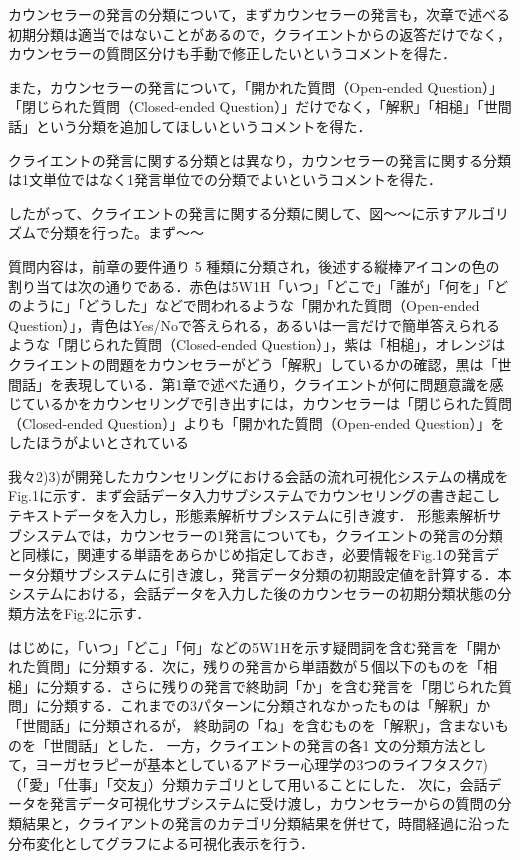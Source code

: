 \documentclass[shuuron]{kuee}
\begin{document}
カウンセラーの発言の分類について，まずカウンセラーの発言も，次章で述べる初期分類は適当ではないことがあるので，クライエントからの返答だけでなく，カウンセラーの質問区分けも手動で修正したいというコメントを得た．

また，カウンセラーの発言について，「開かれた質問（Open-ended Question）」「閉じられた質問（Closed-ended Question）」だけでなく，「解釈」「相槌」「世間話」という分類を追加してほしいというコメントを得た．

クライエントの発言に関する分類とは異なり，カウンセラーの発言に関する分類は1文単位ではなく1発言単位での分類でよいというコメントを得た．

したがって、クライエントの発言に関する分類に関して、図〜〜に示すアルゴリズムで分類を行った。まず〜〜




質問内容は，前章の要件通り 5 種類に分類され，後述する縦棒アイコンの色の割り当ては次の通りである．赤色は5W1H「いつ」「どこで」「誰が」「何を」「どのように」「どうした」などで問われるような「開かれた質問（Open-ended Question）」，青色はYes/Noで答えられる，あるいは一言だけで簡単答えられるような「閉じられた質問（Closed-ended Question）」，紫は「相槌」，オレンジはクライエントの問題をカウンセラーがどう「解釈」しているかの確認，黒は「世間話」を表現している．第1章で述べた通り，クライエントが何に問題意識を感じているかをカウンセリングで引き出すには，カウンセラーは「閉じられた質問（Closed-ended Question）」よりも「開かれた質問（Open-ended Question）」をしたほうがよいとされている

我々2)3)が開発したカウンセリングにおける会話の流れ可視化システムの構成をFig.1に示す．まず会話データ入力サブシステムでカウンセリングの書き起こしテキストデータを入力し，形態素解析サブシステムに引き渡す．
形態素解析サブシステムでは，カウンセラーの1発言についても，クライエントの発言の分類と同様に，関連する単語をあらかじめ指定しておき，必要情報をFig.1の発言データ分類サブシステムに引き渡し，発言データ分類の初期設定値を計算する．本システムにおける，会話データを入力した後のカウンセラーの初期分類状態の分類方法をFig.2に示す．

はじめに，「いつ」「どこ」「何」などの5W1Hを示す疑問詞を含む発言を「開かれた質問」に分類する．次に，残りの発言から単語数が５個以下のものを「相槌」に分類する．さらに残りの発言で終助詞「か」を含む発言を「閉じられた質問」に分類する．これまでの3パターンに分類されなかったものは「解釈」か「世間話」に分類されるが，
終助詞の「ね」を含むものを「解釈」，含まないものを「世間話」とした．
一方，クライエントの発言の各1 文の分類方法として，ヨーガセラピーが基本としているアドラー心理学の3つのライフタスク7)（「愛」「仕事」「交友」）分類カテゴリとして用いることにした．
次に，会話データを発言データ可視化サブシステムに受け渡し，カウンセラーからの質問の分類結果と，クライアントの発言のカテゴリ分類結果を併せて，時間経過に沿った分布変化としてグラフによる可視化表示を行う．
\end{document}
